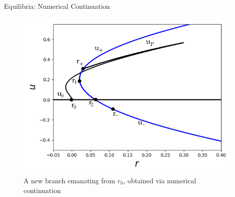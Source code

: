 \documentclass{beamer}
\begin{document}
\begin{frame}{Equilibria: Numerical Continuation}
\begin{figure}[ht]
  \centering
  \includegraphics[scale=0.3]
  {Figs/sh11.png}  
  \caption{A new branch emanating from $r_{0}$, obtained via numerical continuation}
  \label{fig:sh11}
\end{figure}
\end{frame}
\end{document}
